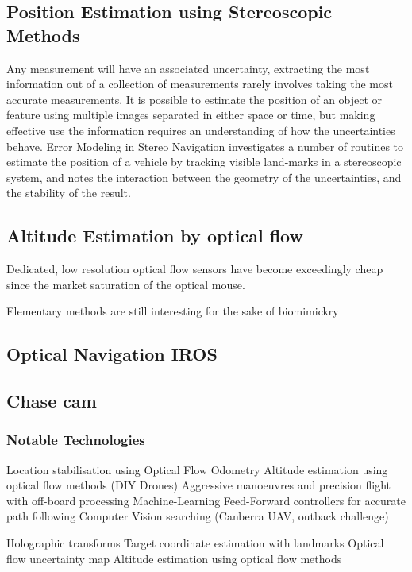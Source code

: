 \documentclass[a4paper, 11pt, titlepage]{article}
\begin{document}
    \subsection{Position Estimation using Stereoscopic Methods}
      Any measurement will have an associated uncertainty, extracting the most information out of a collection of measurements rarely involves taking the most accurate measurements.  It is possible to estimate the position of an object or feature using multiple images separated in either space or time, but making effective use the information requires an understanding of how the uncertainties behave.  Error Modeling in Stereo Navigation \cite{stereoUnc} investigates a number of routines to estimate the position of a vehicle by tracking visible land-marks in a stereoscopic system, and notes the interaction between the geometry of the uncertainties, and the stability of the result.


    \subsection{Altitude Estimation by optical flow}
      Dedicated, low resolution optical flow sensors have become exceedingly cheap since the market saturation of the optical mouse. 

      Elementary methods are still interesting for the sake of biomimickry  \cite{optoAlt}

    \subsection{Optical Navigation IROS}
    \subsection{Chase cam}

    \subsubsection{Notable Technologies}
    Location stabilisation using Optical Flow Odometry
    Altitude estimation using optical flow methods (DIY Drones)
    Aggressive manoeuvres and precision flight with off-board processing
    Machine-Learning Feed-Forward controllers for accurate path following
    Computer Vision searching (Canberra UAV, outback challenge)



    Holographic transforms
    Target coordinate estimation with landmarks
    Optical flow uncertainty map
    Altitude estimation using optical flow methods
\end{document}
